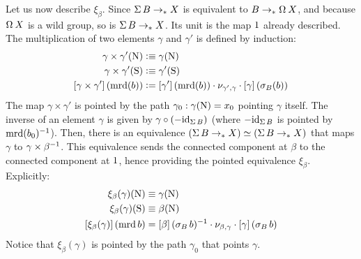 \documentclass[english,a4paper]{lmcs}
\begin{document}
Let us now describe $\xi_\beta$. Since $\operatorname{\Sigma} B \to_\ast X$ is equivalent to $B \ptdto \loopspace\null X$, and because $\loopspace\null X$ is a wild group, so is $\operatorname{\Sigma} B \to_\ast X$. Its unit is the map $1$ already described. The multiplication of two elements $\gamma$ and $\gamma'$ is defined by induction:
\begin{equation}
  \begin{aligned}
    \gamma \times \gamma' (\mathrm{N}) &\vcentcolon\equiv \gamma(\mathrm{N}) \\
    \gamma \times \gamma' (\mathrm{S}) &\vcentcolon\equiv \gamma'(\mathrm{S}) \\
    \left[{\gamma \times \gamma'}\right] (\operatorname{\mathrm{mrd}} (b) ) &\vcentcolon=
    \left[{\gamma'}\right](\operatorname{\mathrm{mrd}}(b)) \cdot \nu_{\gamma',\gamma} \cdot \left[{\gamma}\right](\sigma_B(b))
  \end{aligned}
  \label{eq:wild-group-from-susp-product}
\end{equation}
The map $\gamma \times \gamma'$ is pointed by the path $\gamma_0: \gamma(\mathrm{N}) =
x_0$ pointing $\gamma$ itself.
The inverse of an element $\gamma$ is given by $\gamma \circ (-\mathord{\mathrm{id}}_{\operatorname{\Sigma} B})$
(where $-\mathord{\mathrm{id}}_{\operatorname{\Sigma} B}$ is pointed by $\operatorname{\mathrm{mrd}}(b_0)^{-1}$).  Then, there is an
equivalence $(\operatorname{\Sigma} B \to_\ast X) \simeq (\operatorname{\Sigma} B \to_\ast X)$ that maps $\gamma$ to
$\gamma \times \beta^{-1}$. This equivalence sends the connected component at
$\beta$ to the connected component at $1$, hence providing the pointed
equivalence $\xi_\beta$. Explicitly:
\begin{equation}
  \begin{aligned}
    \xi_\beta(\gamma)(\mathrm{N}) &\equiv \gamma(\mathrm{N}) \\
    \xi_\beta(\gamma)(\mathrm{S}) &\equiv \beta(\mathrm{N}) \\
    \left[{\xi_\beta(\gamma)}\right](\operatorname{\mathrm{mrd}} b)
    &= \left[{\beta}\right](\sigma_B\,b)^{-1} \cdot
    \nu_{\beta,\gamma} \cdot
    \left[{\gamma}\right](\sigma_B\,b)
  \end{aligned}
\end{equation}
Notice that $\xi_\beta(\gamma)$ is pointed by the path $\gamma_0$ that points
$\gamma$.
\end{document}
